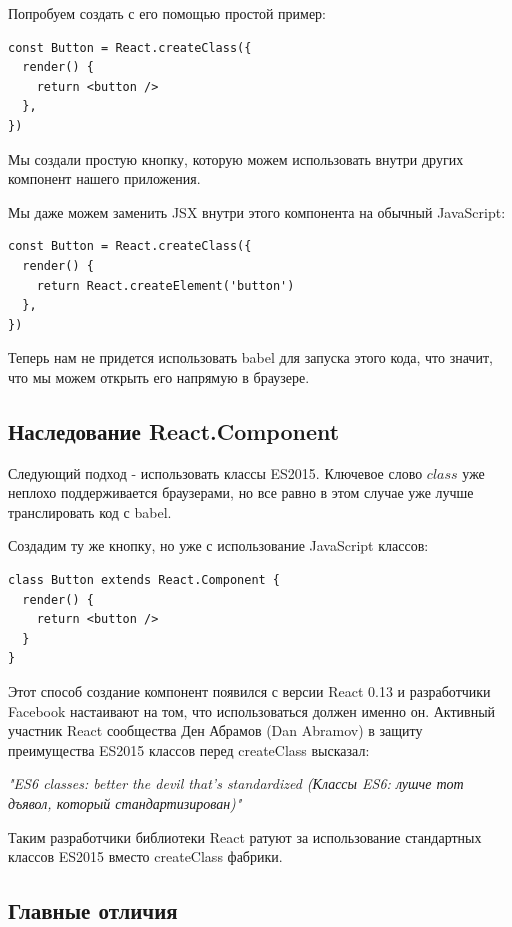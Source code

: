 Попробуем создать с его помощью простой пример:

\begin{lstlisting}
const Button = React.createClass({
  render() {
    return <button />
  },
})
\end{lstlisting}

Мы создали простую кнопку, которую можем использовать внутри других компонент нашего приложения.

Мы даже можем заменить JSX внутри этого компонента на обычный JavaScript:

\begin{lstlisting}
const Button = React.createClass({
  render() {
    return React.createElement('button')
  },
})
\end{lstlisting}

Теперь нам не придется использовать babel для запуска этого кода, что значит, что мы можем открыть его напрямую в браузере.

\subsection{Наследование React.Component}

Следующий подход - использовать классы ES2015. Ключевое слово $class$ уже неплохо поддерживается браузерами, но все равно в этом случае уже лучше транслировать код с babel.

Создадим ту же кнопку, но уже с использование JavaScript классов:

\begin{lstlisting}
class Button extends React.Component {
  render() {
    return <button />
  }
}
\end{lstlisting}

Этот способ создание компонент появился с версии React 0.13 и разработчики Facebook настаивают на том, что использоваться должен именно он. Активный участник React сообщества Ден Абрамов (Dan Abramov) в защиту преимущества ES2015 классов перед createClass высказал: 

\textit{"ES6 classes: better the devil that's standardized (Классы ES6: лушче тот дъявол, который стандартизирован)"}

Таким разработчики библиотеки React ратуют за использование стандартных классов ES2015 вместо createClass фабрики. 

\subsection{Главные отличия}

